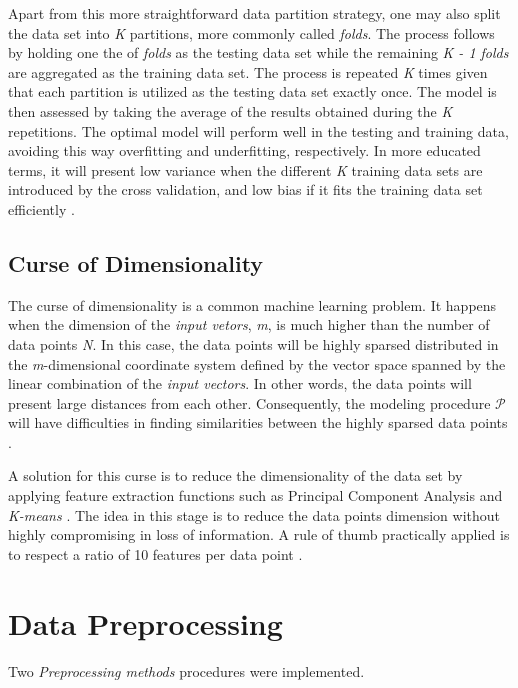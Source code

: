 Apart from this more straightforward data partition strategy, one may also split the data set
into \textit{K} partitions, more commonly called \textit{folds}. The process follows
by holding one the of \textit{folds} as the testing data set while the remaining
\textit{K - 1 folds} are aggregated as the training data set. The process is
repeated \textit{K} times given that each partition is utilized as the testing data
set exactly once. The model is then assessed by taking the average of the results
obtained during the \textit{K} repetitions. The optimal model will perform well
in the testing and training data, avoiding this way overfitting and underfitting,
respectively. In more educated terms, it will present low variance when the
different \textit{K} training data sets are introduced by the cross validation, and
low bias if it fits the training data set efficiently \cite{lecturenotes}.


\subsection{Curse of Dimensionality}

The curse of dimensionality is a common machine learning problem. It happens when
the dimension of the \textit{input vetors}, \textit{m}, is much higher than the
number of data points \textit{N}. In this case, the data points will be highly sparsed
distributed in the \textit{m}-dimensional coordinate system defined by the
vector space spanned by the linear combination of the \textit{input vectors}.
In other words, the data points will present large distances from each other.
Consequently, the modeling procedure $\mathcal{P}$ will have difficulties in
finding similarities between the highly sparsed data points \cite{lecturenotes}.

A solution for this curse is to reduce the dimensionality of the data set by applying feature
extraction functions such as Principal Component Analysis and \textit{K-means} \cite{lecturenotes}. The idea in this
stage is to reduce the data points dimension without highly compromising in loss of
information. A rule of thumb practically applied is to respect a ratio of 10 features
per data point \cite{lecturenotes}.

\section{Data Preprocessing}

Two \textit{Preprocessing methods} procedures were implemented.

